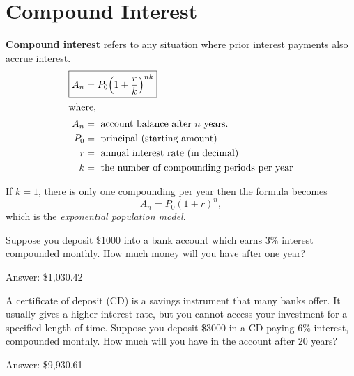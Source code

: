 \newpage

\section{Compound Interest}%
\label{sec:compound-interest}

\begin{definition}
  \textbf{Compound interest} refers to any situation where prior
  interest payments also accrue interest.
  \begin{align}
    \Aboxed{A_{n}&= P_{0} {\left( 1+\frac{r}{k} \right)}^{nk}}
      \label{eq:compound-interest}\\
    \intertext{where,}
    A_{n} &= \text{ account balance after } n \text{ years.} \notag \\
    P_{0} &= \text{ principal (starting amount)} \notag \\
    r &= \text{ annual interest rate (in decimal)} \notag \\
    k &= \text{ the number of compounding periods per year} \notag
  \end{align}
\end{definition}
\begin{note}
  If \(k=1\), \ie{} there is only one compounding per year then the
  formula becomes
  \[
    \boxed{A_{n} = P_{0}{(1+r)}^{n},}
  \]
  which is the \emph{exponential population model}.
\end{note}

\begin{exercise}
  Suppose you deposit \$1000 into a bank account which earns 3\%
  interest compounded monthly. How much money will you have after one
  year?

  \noindent Answer: \$1,030.42
\end{exercise}

\newpage

\begin{exercise}
  A certificate of deposit (CD) is a savings instrument that many
  banks offer. It usually gives a higher interest rate, but you cannot
  access your investment for a specified length of time. Suppose you
  deposit \$3000 in a CD paying 6\% interest, compounded monthly. How
  much will you have in the account after 20 years?

  \noindent Answer: \$9,930.61
\end{exercise}

